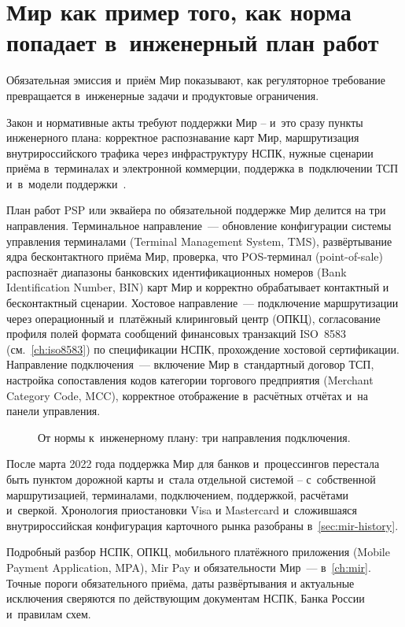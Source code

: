 \section{Мир как пример того, как норма попадает в~инженерный план работ}\label{sec:regulation-mir-mandatory}

Обязательная эмиссия и~приём Мир показывают, как регуляторное требование превращается в~инженерные задачи и продуктовые ограничения.

Закон и нормативные акты требуют поддержки Мир -- и~это сразу пункты инженерного плана: корректное распознавание карт Мир, маршрутизация внутрироссийского трафика через инфраструктуру НСПК, нужные сценарии приёма в~терминалах и электронной коммерции, поддержка в~подключении ТСП и~в~модели поддержки~\cite{cbr-ps,cbr-nps-faq}.

План работ PSP или эквайера по обязательной поддержке Мир делится на три направления.
Терминальное направление~--- обновление конфигурации системы управления терминалами (Terminal Management System, TMS), развёртывание ядра бесконтактного приёма Мир, проверка, что POS-терминал (point-of-sale) распознаёт диапазоны банковских идентификационных номеров (Bank Identification Number, BIN) карт Мир и корректно обрабатывает контактный и бесконтактный сценарии.
Хостовое направление~--- подключение маршрутизации через операционный и~платёжный клиринговый центр (ОПКЦ), согласование профиля полей формата сообщений финансовых транзакций ISO~8583 (см.~\autoref{ch:iso8583}) по спецификации НСПК, прохождение хостовой сертификации.
Направление подключения~--- включение Мир в~стандартный договор ТСП, настройка сопоставления кодов категории торгового предприятия (Merchant Category Code, MCC), корректное отображение в~расчётных отчётах и~на панели управления.

\begin{figure}[tbp]
  \centering
  \caption{От нормы к~инженерному плану: три направления подключения.}\label{fig:regulation-to-engineering}
\end{figure}

После марта 2022 года поддержка Мир для банков и~процессингов
перестала быть пунктом дорожной карты и~стала отдельной системой --
с~собственной маршрутизацией, терминалами, подключением, поддержкой,
расчётами и~сверкой. Хронология приостановки Visa и Mastercard
и~сложившаяся внутрироссийская конфигурация карточного рынка разобраны в~\autoref{sec:mir-history}.

Подробный разбор НСПК, ОПКЦ, мобильного платёжного приложения (Mobile Payment Application, MPA), Mir Pay и обязательности Мир~--- в~\autoref{ch:mir}. Точные пороги обязательного приёма, даты развёртывания и актуальные исключения сверяются по действующим документам НСПК, Банка России и~правилам схем.

